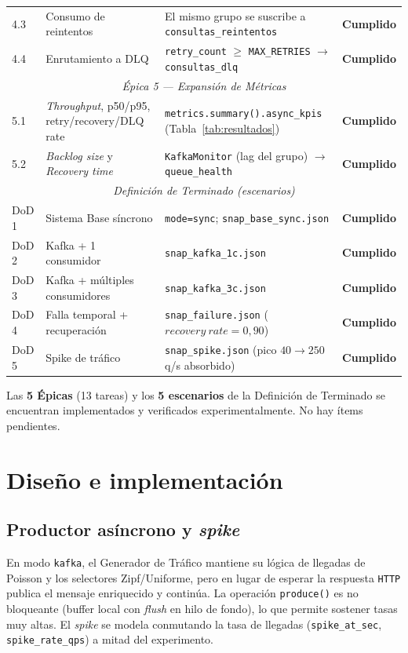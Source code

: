 \documentclass[11pt,a4paper]{article}
\newcommand{\chk}{{\color{kgreen}\textbf{Cumplido}}}
\begin{document}
\begin{longtable}{@{}p{1.1cm}p{5.3cm}p{6.8cm}c@{}}
4.3 & Consumo de reintentos & El mismo grupo se suscribe a \texttt{consultas\_reintentos} & \chk \\
4.4 & Enrutamiento a DLQ & \texttt{retry\_count} $\ge$ \texttt{MAX\_RETRIES} $\to$ \texttt{consultas\_dlq} & \chk \\
\midrule
\multicolumn{4}{c}{\textit{Épica 5 --- Expansión de Métricas}}\\
\midrule
5.1 & \emph{Throughput}, p50/p95, retry/recovery/DLQ rate & \texttt{metrics.summary().async\_kpis} (Tabla~\ref{tab:resultados}) & \chk \\
5.2 & \emph{Backlog size} y \emph{Recovery time} & \texttt{KafkaMonitor} (lag del grupo) $\to$ \texttt{queue\_health} & \chk \\
\midrule
\multicolumn{4}{c}{\textit{Definición de Terminado (escenarios)}}\\
\midrule
DoD 1 & Sistema Base síncrono & \texttt{mode=sync}; \texttt{snap\_base\_sync.json} & \chk \\
DoD 2 & Kafka + 1 consumidor & \texttt{snap\_kafka\_1c.json} & \chk \\
DoD 3 & Kafka + múltiples consumidores & \texttt{snap\_kafka\_3c.json} & \chk \\
DoD 4 & Falla temporal + recuperación & \texttt{snap\_failure.json} ($recovery\ rate=0{,}90$) & \chk \\
DoD 5 & Spike de tráfico & \texttt{snap\_spike.json} (pico $40\to250$ q/s absorbido) & \chk \\
\bottomrule
\end{longtable}

\begin{tcolorbox}[colback=kgreen!6,colframe=kgreen!60,title=Resumen de cumplimiento]
Las \textbf{5 Épicas} (13 tareas) y los \textbf{5 escenarios} de la Definición
de Terminado se encuentran implementados y verificados experimentalmente. No
hay ítems pendientes.
\end{tcolorbox}

\section{Diseño e implementación}

\subsection{Productor asíncrono y \emph{spike}}
En modo \texttt{kafka}, el Generador de Tráfico mantiene su lógica de llegadas
de Poisson y los selectores Zipf/Uniforme, pero en lugar de esperar la
respuesta \texttt{HTTP} publica el mensaje enriquecido y continúa. La operación
\texttt{produce()} es no bloqueante (buffer local con \emph{flush} en hilo de
fondo), lo que permite sostener tasas muy altas. El \emph{spike} se modela
conmutando la tasa de llegadas (\texttt{spike\_at\_sec}, \texttt{spike\_rate\_qps})
a mitad del experimento.
\end{document}
